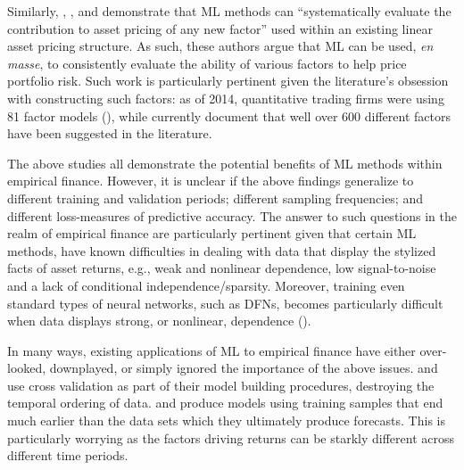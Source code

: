 \documentclass{article}
\begin{document}
Similarly, \cite{kozak_shrinking_2017}, \cite{freyberger_dissecting_2017}, \cite{feng_taming_2019} and \cite{rapach_forecasting_2013} demonstrate that ML methods can ``systematically evaluate the contribution to asset pricing of any new factor'' used within an existing linear asset pricing structure. %
As such, these authors argue that ML can be used, \textit{en masse}, to consistently evaluate the ability of various factors to help price portfolio risk. Such work is particularly pertinent given the literature's obsession with constructing such factors: as of 2014, quantitative trading firms were using 81 factor models (\cite{hsu_finding_2014}), while \cite{harvey_census_2019} currently document that well over 600 different factors have been suggested in the literature. 

The above studies all demonstrate the potential benefits of ML methods within empirical finance. However, it is unclear if the above findings generalize to different training and validation periods; different sampling frequencies; and different loss-measures of predictive accuracy. The answer to such questions in the realm of empirical finance are particularly pertinent given that certain ML methods, have known difficulties in dealing with data that display the stylized facts of asset returns, e.g., weak and nonlinear dependence, low signal-to-noise and a lack of conditional independence/sparsity. Moreover, training even standard types of neural networks, such as DFNs, becomes particularly difficult when data displays strong, or nonlinear, dependence (\cite{bengio_learning_1994}). 

In many ways, existing applications of ML to empirical finance have either over-looked, downplayed, or simply ignored the importance of the above  issues. \cite{messmer_deep_2017} and \cite{feng_deep_2018} use cross validation as part of their model building procedures, destroying the temporal ordering of data. \cite{gu_empirical_2019} and \cite{messmer_deep_2017} produce models using training samples that end much earlier than the data sets which they ultimately produce forecasts. %
This is particularly worrying as the factors driving returns can be starkly different across different time periods. %
\end{document}
